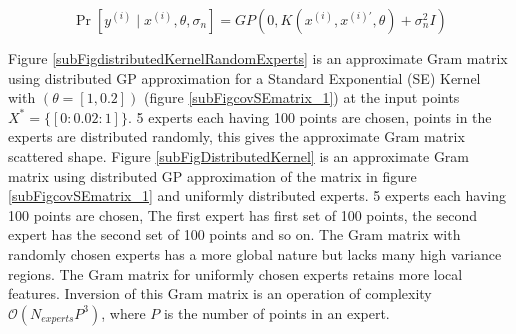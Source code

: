 \begin{equation}\label{distributedGPPrior}
    \Pr[y^{(i)} \mid x^{(i)}, \theta, \sigma_{n}] = GP(0, K(x^{(i)}, x^{(i)'}, \theta) + \sigma^{2}_{n}I) 
\end{equation}

Figure \ref{subFigdistributedKernelRandomExperts} is an approximate Gram matrix using distributed GP approximation for a Standard Exponential (SE) Kernel with \((\theta = [1, 0.2])\) (figure \ref{subFigcovSEmatrix_1}) at the input points \(X^{*} = \{[0:0.02:1]\}\). 5 experts each having 100 points are chosen, points in the experts are distributed randomly, this gives the approximate Gram matrix scattered shape. Figure \ref{subFigDistributedKernel} is an approximate Gram matrix using distributed GP approximation of the matrix in figure \ref{subFigcovSEmatrix_1} and uniformly distributed experts. 5 experts each having 100 points are chosen, The first expert has first set of 100 points, the second expert has the second set of 100 points and so on. The Gram matrix with randomly chosen experts has a more global nature but lacks many high variance regions. The Gram matrix for uniformly chosen experts retains more local features. Inversion of this Gram matrix is an operation of complexity \(\mathcal{O}(N_{experts}P^{3})\), where \(P\) is the number of points in an expert.


